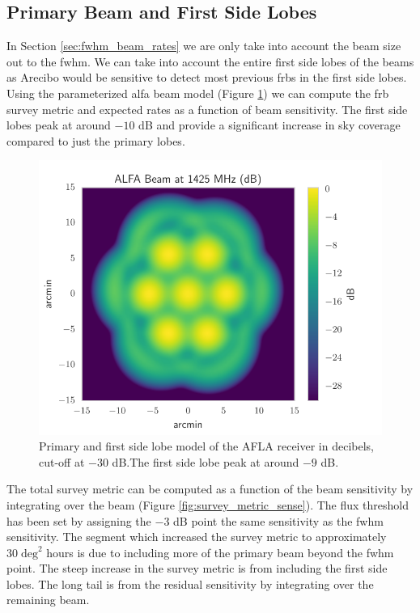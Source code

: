 \documentclass[a4paper,fleqn,usenatbib]{mnras}
\begin{document}
\subsection{Primary Beam and First Side Lobes}
\label{sec:full_beam_rates}

In Section \ref{sec:fwhm_beam_rates} we are only take into account the beam
size out to the \gls{fwhm}. We can take into account the entire first side lobes
of the beams as Arecibo would be sensitive to detect most previous
\glspl{frb} in the first side lobes. Using the parameterized \gls{alfa} beam
model (Figure \ref{fig:alfa_beam}) \citep{GALFAbeam} we can compute the
\gls{frb} survey metric and expected rates as a function of beam sensitivity.
The first side lobes peak at around $-10$ dB and provide a significant increase
in sky coverage compared to just the primary lobes.

\begin{figure}
    \includegraphics[width=1.0\linewidth]{figures/ALFA_beam_1425MHz_dB.pdf}
    \caption{Primary and first side lobe model of the AFLA receiver in
    decibels, cut-off at $-30$ dB.The first side lobe peak at around $-9$ dB.
    }
    \label{fig:alfa_beam}
\end{figure}

The total survey metric can be computed as a function of the beam sensitivity by
integrating over the beam (Figure \ref{fig:survey_metric_sense}). The flux
threshold has been set by assigning the $-3$ dB point the same sensitivity as the
\gls{fwhm} sensitivity. The segment which increased the survey metric to
approximately $30 \; \textrm{deg}^2$ hours is due to including more of the
primary beam beyond the \gls{fwhm} point. The steep increase in the survey
metric is from including the first side lobes. The long tail is from the residual
sensitivity by integrating over the remaining beam.
\end{document}
